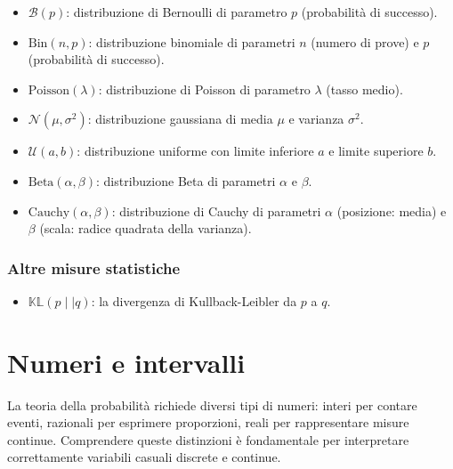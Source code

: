 \documentclass[
  italian,
  letterpaper,
  a4paper,
  11pt,
  open=any]{scrbook}
\providecommand{\tightlist}{%
  \setlength{\itemsep}{0pt}\setlength{\parskip}{0pt}}
\theoremstyle{plain}
\theoremstyle{definition}
\theoremstyle{definition}
\theoremstyle{remark}
\begin{document}
\begin{itemize}
\tightlist
\item
  \(\mathcal{B}(p)\): distribuzione di Bernoulli di parametro \(p\)
  (probabilità di successo).
\item
  \(\mbox{Bin}(n, p)\): distribuzione binomiale di parametri \(n\)
  (numero di prove) e \(p\) (probabilità di successo).
\item
  \(\mbox{Poisson}(\lambda)\): distribuzione di Poisson di parametro
  \(\lambda\) (tasso medio).
\item
  \(\mathcal{N}(\mu, \sigma^2)\): distribuzione gaussiana di media
  \(\mu\) e varianza \(\sigma^2\).
\item
  \(\mathcal{U}(a, b)\): distribuzione uniforme con limite inferiore
  \(a\) e limite superiore \(b\).
\item
  \(\mbox{Beta}(\alpha, \beta)\): distribuzione Beta di parametri
  \(\alpha\) e \(\beta\).
\item
  \(\mbox{Cauchy}(\alpha, \beta)\): distribuzione di Cauchy di parametri
  \(\alpha\) (posizione: media) e \(\beta\) (scala: radice quadrata
  della varianza).
\end{itemize}

\subsection{Altre misure statistiche}\label{altre-misure-statistiche}

\begin{itemize}
\tightlist
\item
  \(\mathbb{KL} (p \mid\mid q)\): la divergenza di Kullback-Leibler da
  \(p\) a \(q\).
\end{itemize}

\chapter{Numeri e intervalli}\label{sec-apx-numbers}

\begin{tcolorbox}[enhanced jigsaw, arc=.35mm, bottomrule=.15mm, bottomtitle=1mm, breakable, colback=white, colbacktitle=quarto-callout-note-color!10!white, colframe=quarto-callout-note-color-frame, coltitle=black, left=2mm, leftrule=.75mm, opacityback=0, opacitybacktitle=0.6, rightrule=.15mm, title=\textcolor{quarto-callout-note-color}{\faInfo}\hspace{0.5em}{Perché questa appendice è importante}, titlerule=0mm, toprule=.15mm, toptitle=1mm]

La teoria della probabilità richiede diversi tipi di numeri: interi per
contare eventi, razionali per esprimere proporzioni, reali per
rappresentare misure continue. Comprendere queste distinzioni è
fondamentale per interpretare correttamente variabili casuali discrete e
continue.

\end{tcolorbox}
\end{document}
